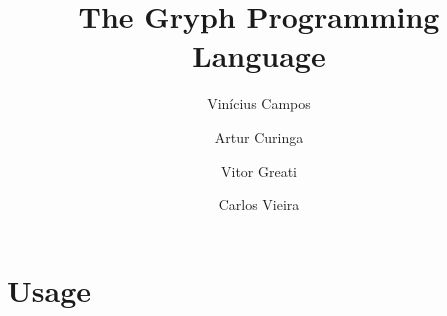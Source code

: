 \documentclass{article}
\title{The Gryph Programming Language}
\author{Vinícius Campos \and Artur Curinga \and Vitor Greati \and Carlos Vieira}
\begin{document}
\maketitle


\tableofcontents

\newpage



\section{Usage}
\label{sec:usage}








\end{document}
